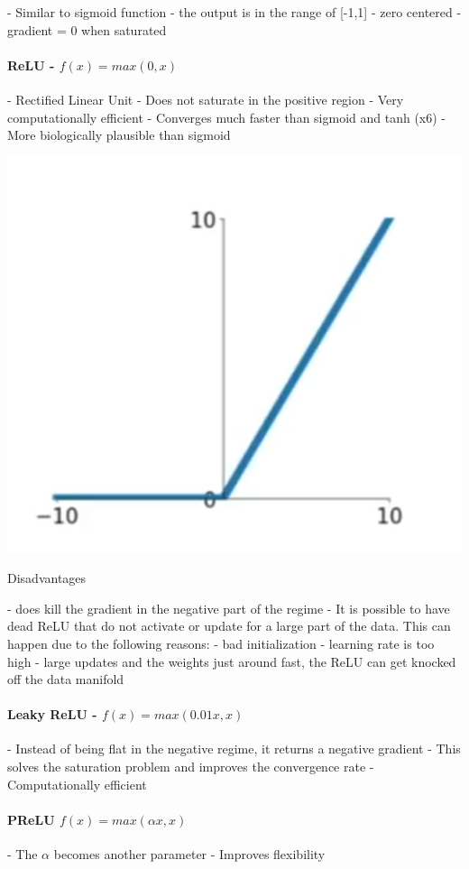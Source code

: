 - Similar to sigmoid function
- the output is in the range of [-1,1]
- zero centered
- gradient = 0 when saturated

\paragraph{ReLU - $f(x) = max(0,x)$ }

- Rectified Linear Unit
- Does not saturate in the positive region
- Very computationally efficient
- Converges much faster than sigmoid and tanh (x6)
- More biologically plausible than sigmoid

\includegraphics[width=0.5\columnwidth]{"fei_fei_li/lecture_06/Screenshot 2019-10-18 at 13.31.23.png"}

 Disadvantages

- does kill the gradient in the negative part of the regime
- It is possible to have dead ReLU that do not activate or update for a large part of the data. This can happen due to the following reasons:
  - bad initialization
  - learning rate is too high - large updates and the weights just around fast, the ReLU can get knocked off the data manifold

\paragraph{Leaky ReLU - $f(x) = max(0.01x, x)$ }

- Instead of being flat in the negative regime, it returns a negative gradient
- This solves the saturation problem and improves the convergence rate
- Computationally efficient

\paragraph{PReLU $f(x) = max(\alpha x, x)$}

- The $\alpha$ becomes another parameter
- Improves flexibility

